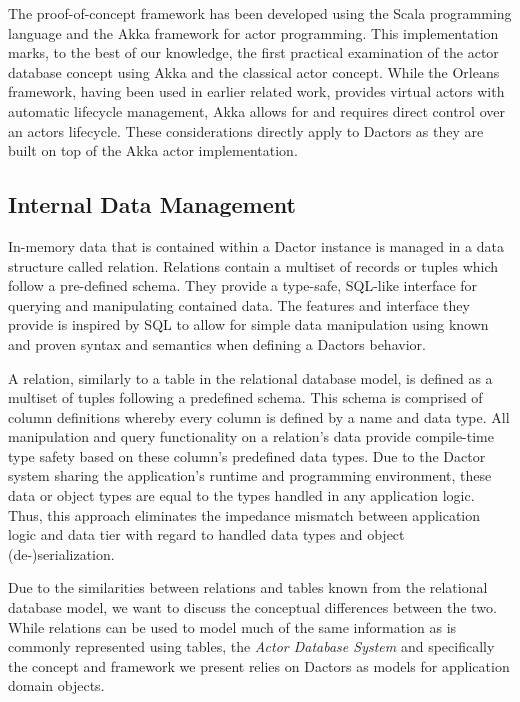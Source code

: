 The proof-of-concept framework has been developed using the Scala programming language and the Akka framework for actor programming.
This implementation marks, to the best of our knowledge, the first practical examination of the actor database concept using Akka and the classical actor concept.
While the Orleans framework, having been used in earlier related work, provides virtual actors with automatic lifecycle management, Akka allows for and requires direct control over an actors lifecycle.
These considerations directly apply to Dactors as they are built on top of the Akka actor implementation.

\subsection{Internal Data Management}

In-memory data that is contained within a Dactor instance is managed in a data structure called relation.
Relations contain a multiset of records or tuples which follow a pre-defined schema.
They provide a type-safe, SQL-like interface for querying and manipulating contained data.
The features and interface they provide is inspired by SQL to allow for simple data manipulation using known and proven syntax and semantics when defining a Dactors behavior.

A relation, similarly to a table in the relational database model, is defined as a multiset of tuples following a predefined schema.
This schema is comprised of column definitions whereby every column is defined by a name and data type.
All manipulation and query functionality on a relation's data provide compile-time type safety based on these column's predefined data types.
Due to the Dactor system sharing the application's runtime and programming environment, these data or object types are equal to the types handled in any application logic.
Thus, this approach eliminates the impedance mismatch between application logic and data tier with regard to handled data types and object (de-)serialization.

Due to the similarities between relations and tables known from the relational database model, we want to discuss the conceptual differences between the two.
While relations can be used to model much of the same information as is commonly represented using tables, the \textit{Actor Database System} and specifically the concept and framework we present relies on Dactors as models for application domain objects.


